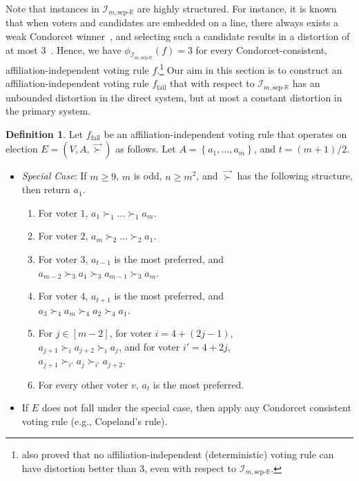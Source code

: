 \documentclass[letterpaper]{article} %
\theoremstyle{definition}
\newtheorem{definition}{Definition}
\newcommand{\set}[1]{\left\{#1\right\}}
\renewcommand{\vec}{\overrightarrow}
\newcommand{\bbR}{\mathbb{R}}
\newcommand{\calI}{\mathcal{I}}
\newcommand{\vsucc}{\vec{\succ}}
\newcommand{\sep}{\textrm{sep-}}
\newcommand{\eucline}{\bbR}
\newcommand{\euclinesep}{\sep\eucline}
\newcommand{\I}{\calI}
\newcommand{\fail}{{\textrm{fail}}}
\begin{document}
Note that instances in $\I_{m,\euclinesep}$ are highly structured. For instance, it is known that when voters and candidates are embedded on a line, there always exists a weak Condorcet winner~\cite{Bla48}, and selecting such a candidate results in a distortion of at most $3$~\cite{ABP15}. Hence, we have $\phi_{\I_{m,\euclinesep}}(f) = 3$ for every Condorcet-consistent, affiliation-independent voting rule $f$.\footnote{\cite{ABP15} also proved that no affiliation-independent (deterministic) voting rule can have distortion better than $3$, even with respect to $\I_{m,\euclinesep}$.}
Our aim in this section is to construct an affiliation-independent voting rule $f_\fail$ that with respect to $\I_{m,\euclinesep}$ has an unbounded distortion in the direct system, but at most a constant distortion in the primary system.%
\begin{definition}
	Let $f_\fail$ be an affiliation-independent voting rule that operates on election $E = (V,A,\vsucc)$ as follows. Let $A = \set{a_1,\ldots,a_m}$, and $t = (m+1)/2$.
\begin{itemize}
	\item \emph{Special Case}: If $m \ge 9$, $m$ is odd, $n \ge m^2$, and $\vsucc$ has the following structure, then return $a_1$.
	\begin{enumerate}
		\item For voter $1$, $a_1 \succ_1 \ldots \succ_1 a_m$.
		\item For voter $2$, $a_m \succ_2 \ldots \succ_2 a_1$.
		\item For voter $3$, $a_{t-1}$ is the most preferred, and \\ $a_{m-2} \succ_3 a_1 \succ_3 a_{m-1} \succ_3 a_m$.
		\item For voter $4$, $a_{t+1}$ is the most preferred, and \\ $a_3 \succ_4 a_m \succ_4 a_2 \succ_4 a_1$.
		\item For $j \in [m-2]$, for voter $i = 4+(2j-1)$, \\ $a_{j+1} \succ_i a_{j+2} \succ_i a_j$, and for voter $i' = 4+2j$, \\ $a_{j+1} \succ_{i'} a_j \succ_{i'} a_{j+2}$.
		\item For every other voter $v$, $a_t$ is the most preferred.
			\end{enumerate}
	\item If $E$ does not fall under the special case, then apply any Condorcet consistent voting rule (e.g., Copeland's rule).
\end{itemize}
\end{definition}
\end{document}
